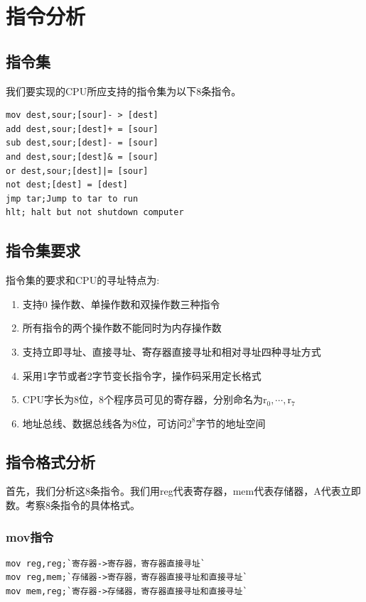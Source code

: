 \documentclass[UTF8]{ctexrep}
\begin{document}
\chapter{指令分析}

\section{指令集}

我们要实现的CPU所应支持的指令集为以下8条指令。
\begin{lstlisting}[language={[x86masm]Assembler}]
mov dest,sour;[sour]- > [dest]
add dest,sour;[dest]+ = [sour]
sub dest,sour;[dest]- = [sour]
and dest,sour;[dest]& = [sour]
or dest,sour;[dest]|= [sour]
not dest;[dest] = [dest]
jmp tar;Jump to tar to run
hlt; halt but not shutdown computer
\end{lstlisting}

\section{指令集要求}
指令集的要求和CPU的寻址特点为:
\begin{enumerate}
\item 支持0 操作数、单操作数和双操作数三种指令
\item 所有指令的两个操作数不能同时为内存操作数
\item 支持立即寻址、直接寻址、寄存器直接寻址和相对寻址四种寻址方式
\item 采用1字节或者2字节变长指令字，操作码采用定长格式
\item CPU字长为8位，8个程序员可见的寄存器，分别命名为$\mathrm{r_0,\cdots,r_7}$
\item 地址总线、数据总线各为8位，可访问$2^8$字节的地址空间
\end{enumerate}

\section{指令格式分析}

首先，我们分析这8条指令。我们用reg代表寄存器，mem代表存储器，A代表立即数。考察8条指令的具体格式。

\subsection{mov指令}

\begin{lstlisting}[language={[x86masm]Assembler}]
mov reg,reg;`寄存器->寄存器，寄存器直接寻址`
mov reg,mem;`存储器->寄存器，寄存器直接寻址和直接寻址`
mov mem,reg;`寄存器->存储器，寄存器直接寻址和直接寻址`
\end{lstlisting}
\end{document}
